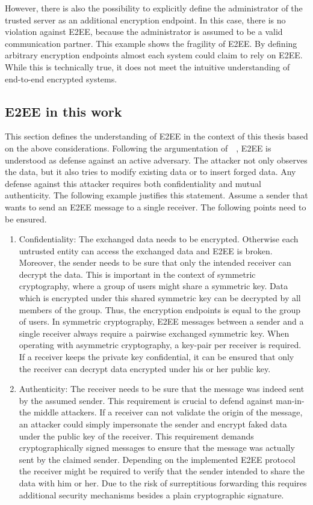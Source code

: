 \documentclass[../main.tex]{subfiles}
\begin{document}
However, there is also the possibility to explicitly define the administrator of the trusted server as an additional encryption endpoint.
In this case, there is no violation against E2EE, because the administrator is assumed to be a valid communication partner.
This example shows the fragility of E2EE.
By defining arbitrary encryption endpoints almost each system could claim to rely on E2EE.
While this is technically true, it does not meet the intuitive understanding of end-to-end encrypted systems.

\subsection{E2EE in this work}
This section defines the understanding of E2EE in the context of this thesis based on the above considerations.
Following the argumentation of~\citeauthor{Hale2022}~\cite{Hale2022}, E2EE is understood as defense against an active adversary.
The attacker not only observes the data, but it also tries to modify existing data or to insert forged data.
Any defense against this attacker requires both confidentiality and mutual authenticity.
The following example justifies this statement.
Assume a sender that wants to send an E2EE message to a single receiver.
The following points need to be ensured.
\begin{enumerate}
    \item Confidentiality: 
    The exchanged data needs to be encrypted. Otherwise each untrusted entity can access the exchanged data and E2EE is broken.
    Moreover, the sender needs to be sure that only the intended receiver can decrypt the data. 
    This is important in the context of symmetric cryptography, where a group of users might share a symmetric key.
    Data which is encrypted under this shared symmetric key can be decrypted by all members of the group.
    Thus, the encryption endpoints is equal to the group of users.
    In symmetric cryptography, E2EE messages between a sender and a single receiver always require a pairwise exchanged symmetric key.
    When operating with asymmetric cryptography, a key-pair per receiver is required.
    If a receiver keeps the private key confidential, it can be ensured that only the receiver can decrypt data encrypted under his or her public key.
    \item Authenticity: 
    The receiver needs to be sure that the message was indeed sent by the assumed sender. 
    This requirement is crucial to defend against man-in-the middle attackers.
    If a receiver can not validate the origin of the message, an attacker could simply impersonate the sender and encrypt faked data under the public key of the receiver.
    This requirement demands cryptographically signed messages to ensure that the message was actually sent by the claimed sender.
    Depending on the implemented E2EE protocol the receiver might be required to verify that the sender intended to share the data with him or her.
    Due to the risk of surreptitious forwarding this requires additional security mechanisms besides a plain cryptographic signature.
\end{enumerate}
\end{document}
